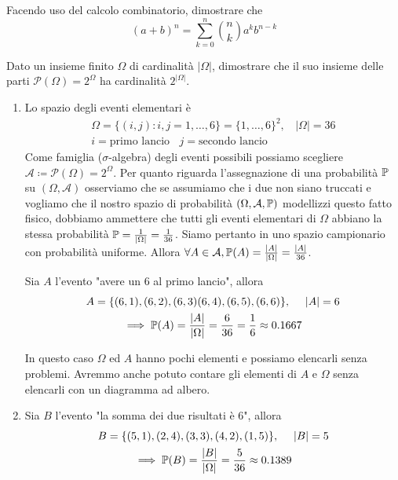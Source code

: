 \Esercizio{}

Facendo uso del calcolo combinatorio, dimostrare che
\begin{equation*}
	(a+b)^{n} =\sum\limits_{k=0}^{n}\binom{n}{k} a^{k} b^{n-k}
\end{equation*}

\Esercizio{}

Dato un insieme finito $\Omega $ di cardinalità $| \Omega | $, dimostrare che il suo insieme delle parti $\mathcal{P}(\Omega) =2^{\Omega }$ ha cardinalità $2^{| \Omega | }$.

\ParteSoluzioni

\Soluzione

\begin{enumerate}
	\item Lo spazio degli eventi elementari è
	\begin{gather*}
		\Omega =\{(i,j) :i,j=1,\dots ,6\} =\{1,\dots ,6\}^{2} ,\ \ \ \ | \Omega | =36\\
		i=\text{primo lancio} \ \ \ \ j=\text{secondo lancio}
	\end{gather*}
	Come famiglia ($\sigma $-algebra) degli eventi possibili possiamo scegliere $\mathcal{A} \coloneqq \mathcal{P}(\Omega) =2^{\Omega }$. Per quanto riguarda l'assegnazione di una probabilità $\mathbb{P}$ su $(\Omega ,\mathcal{A})$ osserviamo che se assumiamo che i due non siano truccati e vogliamo che il nostro spazio di probabilità $(\Omega ,\mathcal{A} ,\mathbb{P})$ modellizzi questo fatto fisico, dobbiamo ammettere che tutti gli eventi elementari di $\Omega $ abbiano la stessa probabilità $\mathbb{P} =\frac{1}{| \Omega | } =\frac{1}{36}$. Siamo pertanto in uno spazio campionario con probabilità uniforme. Allora $\forall A\in \mathcal{A} ,\mathbb{P}(A) =\frac{| A| }{| \Omega | } =\frac{| A| }{36}$.

	Sia $A$ l'evento "avere un $6$ al primo lancio", allora
	\begin{gather*}
		A=\{(6,1) ,(6,2) ,(6,3)(6,4) ,(6,5) ,(6,6)\} ,\ \ \ \ | A| =6\\
		\implies \mathbb{P}(A) =\frac{| A| }{| \Omega | } =\frac{6}{36} =\frac{1}{6} \approx 0.1667
	\end{gather*}

	\begin{oss}
		In questo caso $\Omega $ ed $A$ hanno pochi elementi e possiamo elencarli senza problemi. Avremmo anche potuto contare gli elementi di $A$ e $\Omega $ senza elencarli con un diagramma ad albero.
	\end{oss}

	\item Sia $B$ l'evento "la somma dei due risultati è $6$", allora
	\begin{gather*}
		B=\{(5,1) ,(2,4) ,(3,3) ,(4,2) ,(1,5)\} ,\ \ \ \ | B| =5\\
		\implies \mathbb{P}(B) =\frac{| B| }{| \Omega | } =\frac{5}{36} \approx 0.1389
	\end{gather*}


\end{enumerate}
